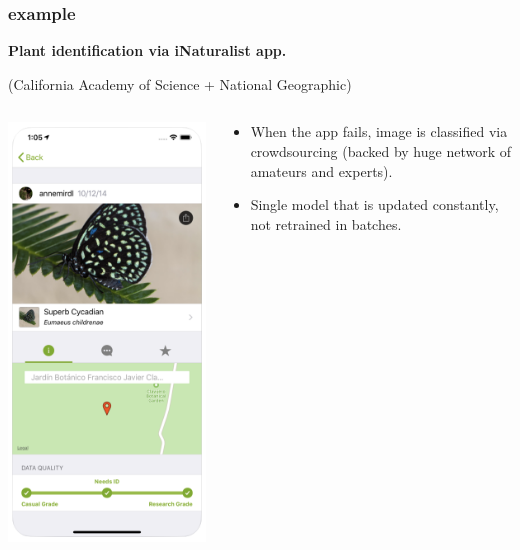 \documentclass[compress]{beamer}
\begin{document}
\begin{frame}
	\frametitle{example}
	\begin{center}
	\textbf{Plant identification via iNaturalist app.}
		
	(California Academy of Science + National Geographic)
	\end{center}
\begin{columns}
	\begin{column}{.5\textwidth}
		\centering
		\includegraphics[width=.5\textwidth]{inaturalist.png}
	\end{column}
	\begin{column}{.5\textwidth}
		\begin{itemize}
			\item When the app fails, image is classified via crowdsourcing (backed by huge network of amateurs and experts).
		
			\item Single model that is updated constantly, not retrained in batches.
		\end{itemize}
	\end{column}
\end{columns}
\end{frame}
\end{document}
